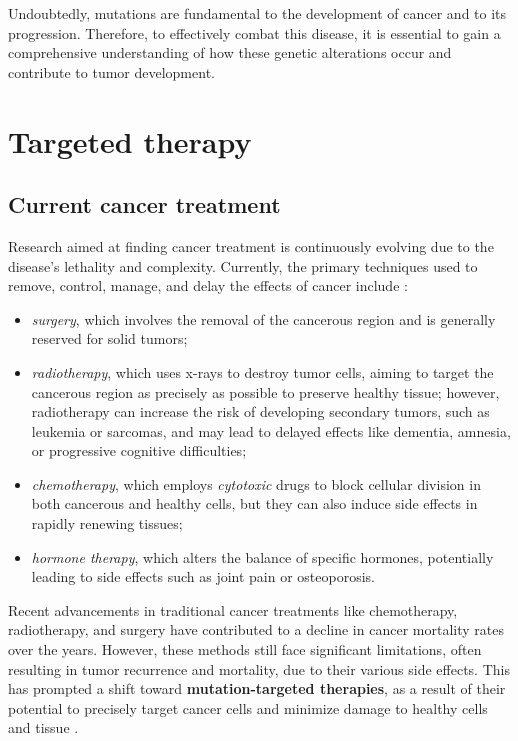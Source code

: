 Undoubtedly, mutations are fundamental to the development of cancer and to its progression. Therefore, to effectively combat this disease, it is essential to gain a comprehensive understanding of how these genetic alterations occur and contribute to tumor development.

\section{Targeted therapy}

\subsection{Current cancer treatment}

Research aimed at finding cancer treatment is continuously evolving due to the disease's lethality and complexity. Currently, the primary techniques used to remove, control, manage, and delay the effects of cancer include \cite{cancer_treat}:

\begin{itemize}
    \item \textit{surgery}, which involves the removal of the cancerous region and is generally reserved for solid tumors;
    \item \textit{radiotherapy}, which uses x-rays to destroy tumor cells, aiming to target the cancerous region as precisely as possible to preserve healthy tissue; however, radiotherapy can increase the risk of developing secondary tumors, such as leukemia or sarcomas, and may lead to delayed effects like dementia, amnesia, or progressive cognitive difficulties;
    \item \textit{chemotherapy}, which employs \textit{cytotoxic} drugs to block cellular division in both cancerous and healthy cells, but they can also induce side effects in rapidly renewing tissues;
    \item \textit{hormone therapy}, which alters the balance of specific hormones, potentially leading to side effects such as joint pain or osteoporosis.
\end{itemize}

Recent advancements in traditional cancer treatments like chemotherapy, radiotherapy, and surgery have contributed to a decline in cancer mortality rates over the years. However, these methods still face significant limitations, often resulting in tumor recurrence and mortality, due to their various side effects. This has prompted a shift toward \textbf{mutation-targeted therapies}, as a result of their potential to precisely target cancer cells and minimize damage to healthy cells and tissue \cite{target_therapy1, jci}.

